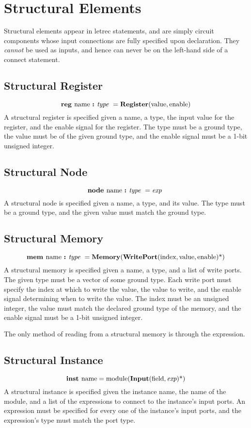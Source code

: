 \documentclass[12pt]{article}
\begin{document}
\section{Structural Elements} \label{elements}

Structural elements appear in letrec statements, and are simply circuit components whose input connections are fully specified upon declaration. They {\em cannot} be used as inputs, and hence can never be on the left-hand side of a connect statement. 

\subsection{Structural Register}
\[
\text{\bf reg\ } \text{name } \text{\bf :\ } \text{\em type\ } = \text{\bf Register}(\text{value}, \text{enable})   
\]
A structural register is specified given a name, a type, the input value for the register, and the enable signal for the register. The type must be a ground type, the value must be of the given ground type, and the enable signal must be a 1-bit unsigned integer. 

\subsection{Structural Node}
\[
\text{\bf node\ } \text{name } \text{\bf :\ } \text{\em type\ } = \text{\em exp\ }
\]
A structural node is specified given a name, a type, and its value. The type must be a ground type, and the given value must match the ground type.

\subsection{Structural Memory}
\[
\text{\bf mem\ } \text{name } \text{\bf :\ } \text{\em type\ } =
\text{\bf Memory}(\text{\bf WritePort}(\text{index}, \text{value}, \text{enable})\text{*})  
\]
A structural memory is specified given a name, a type, and a list of write ports. The given type must be a vector of some ground type. Each write port must specify the index at which to write the value, the value to write, and the enable signal determining when to write the value. The index must be an unsigned integer, the value must match the declared ground type of the memory, and the enable signal must be a 1-bit unsigned integer. 

The only method of reading from a structural memory is through the  expression. 

\subsection{Structural Instance}
\[
\text{\bf inst\ } \text{name} = \text{module}(\text{\bf Input}(\text{field},\text{\em exp})\text{*})              
\]
A structural instance is specified given the instance name, the name of the module, and a list of the expressions to connect to the instance's input ports. An expression must be specified for every one of the instance's input ports, and the expression's type must match the port type.
\end{document}
